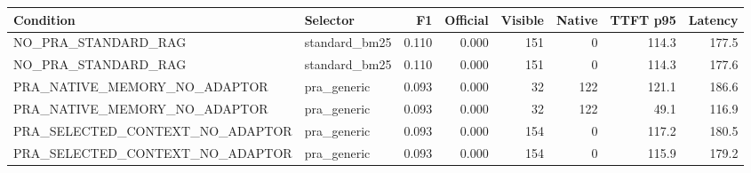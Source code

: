 \begin{tabular}{llrrrrrr}
\toprule
Condition & Selector & F1 & Official & Visible & Native & TTFT p95 & Latency \\
\midrule
NO\_PRA\_STANDARD\_RAG & standard\_bm25 & 0.110 & 0.000 & 151 & 0 & 114.3 & 177.5 \\
NO\_PRA\_STANDARD\_RAG & standard\_bm25 & 0.110 & 0.000 & 151 & 0 & 114.3 & 177.6 \\
PRA\_NATIVE\_MEMORY\_NO\_ADAPTOR & pra\_generic & 0.093 & 0.000 & 32 & 122 & 121.1 & 186.6 \\
PRA\_NATIVE\_MEMORY\_NO\_ADAPTOR & pra\_generic & 0.093 & 0.000 & 32 & 122 & 49.1 & 116.9 \\
PRA\_SELECTED\_CONTEXT\_NO\_ADAPTOR & pra\_generic & 0.093 & 0.000 & 154 & 0 & 117.2 & 180.5 \\
PRA\_SELECTED\_CONTEXT\_NO\_ADAPTOR & pra\_generic & 0.093 & 0.000 & 154 & 0 & 115.9 & 179.2 \\
\bottomrule
\end{tabular}
